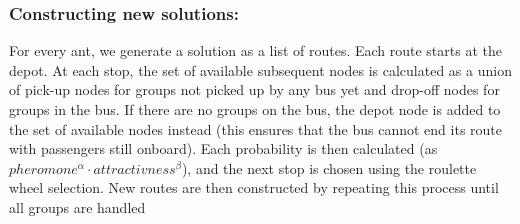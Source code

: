 \subsubsection*{Constructing new solutions:}
For every ant, we generate a solution as a list of routes. Each route starts at the depot. At each stop, the set of available subsequent nodes is calculated as a union of pick-up nodes for groups not picked up by any bus yet and drop-off nodes for groups in the bus. If there are no groups on the bus, the depot node is added to the set of available nodes instead (this ensures that the bus cannot end its route with passengers still onboard). Each probability is then calculated (as $pheromone^\alpha \cdot attractivness^\beta$), and the next stop is chosen using the roulette wheel selection. New routes are then constructed by repeating this process until all groups are handled

\fi